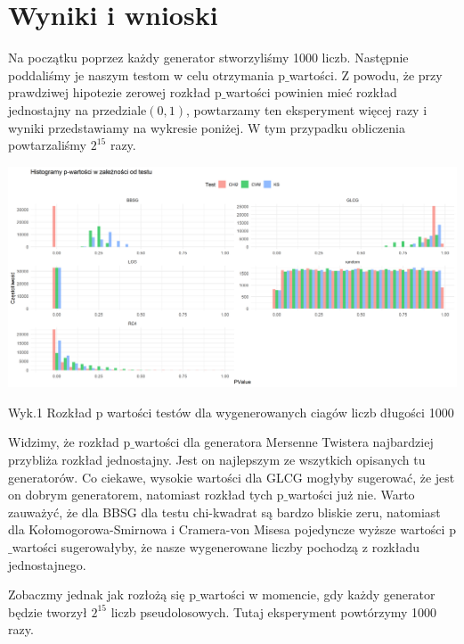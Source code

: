 \documentclass[12pt]{mwart}\usepackage[]{graphicx}\usepackage[]{xcolor}
\begin{document}
\newpage
\section*{Wyniki i wnioski}
Na początku poprzez każdy generator stworzyliśmy 1000 liczb. Następnie poddaliśmy je naszym testom w celu otrzymania p$\_$wartości. Z powodu, że przy prawdziwej hipotezie zerowej rozkład p$\_$wartości powinien mieć rozkład jednostajny na przedziale$(0,1)$, powtarzamy ten eksperyment więcej razy i wyniki przedstawiamy na wykresie poniżej. W tym przypadku obliczenia powtarzaliśmy $2^{15}$ razy.

\begin{center}
\includegraphics[scale=0.45]{p_wartosc_a_test.png}
\caption{Wyk.1 Rozkład p wartości testów dla  wygenerowanych ciagów liczb długości 1000}
\end{center}


Widzimy, że rozkład p$\_$wartości dla generatora Mersenne Twistera najbardziej przybliża rozkład jednostajny. Jest on najlepszym ze wszytkich opisanych tu generatorów. Co ciekawe, wysokie wartości dla GLCG mogłyby sugerować, że jest on dobrym generatorem, natomiast rozkład tych p$\_$wartości już nie. Warto zauważyć, że dla BBSG dla testu chi-kwadrat są bardzo bliskie zeru, natomiast dla Kołomogorowa-Smirnowa i Cramera-von Misesa pojedyncze wyższe wartości p$\_$wartości sugerowałyby, że nasze wygenerowane liczby pochodzą z rozkładu jednostajnego. 

Zobaczmy jednak jak rozłożą się p$\_$wartości w momencie, gdy każdy generator będzie tworzył $2^{15}$ liczb pseudolosowych. Tutaj eksperyment powtórzymy 1000 razy.
\end{document}
